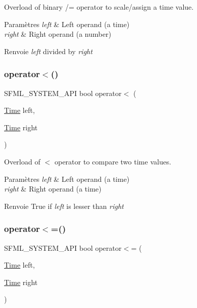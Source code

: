 Overload of binary /= operator to scale/assign a time value. 


\begin{DoxyParams}{Paramètres}
{\em left} & Left operand (a time) \\
\hline
{\em right} & Right operand (a number)\\
\hline
\end{DoxyParams}
\begin{DoxyReturn}{Renvoie}
{\itshape left} divided by {\itshape right} 
\end{DoxyReturn}
\mbox{\label{classsf_1_1Time_ac222933174ddcff5d14c3ac7d1020d54}} 
\subsubsection{\texorpdfstring{operator$<$()}{operator<()}}
{\footnotesize\ttfamily S\+F\+M\+L\+\_\+\+S\+Y\+S\+T\+E\+M\+\_\+\+A\+PI bool operator$<$ (\begin{DoxyParamCaption}\item[{\hyperlink{classsf_1_1Time}{Time}}]{left,  }\item[{\hyperlink{classsf_1_1Time}{Time}}]{right }\end{DoxyParamCaption})\hspace{0.3cm}{\ttfamily [related]}}



Overload of $<$ operator to compare two time values. 


\begin{DoxyParams}{Paramètres}
{\em left} & Left operand (a time) \\
\hline
{\em right} & Right operand (a time)\\
\hline
\end{DoxyParams}
\begin{DoxyReturn}{Renvoie}
True if {\itshape left} is lesser than {\itshape right} 
\end{DoxyReturn}
\mbox{\label{classsf_1_1Time_a2c22369869bf903578635bc6517c44d4}} 
\subsubsection{\texorpdfstring{operator$<$=()}{operator<=()}}
{\footnotesize\ttfamily S\+F\+M\+L\+\_\+\+S\+Y\+S\+T\+E\+M\+\_\+\+A\+PI bool operator$<$= (\begin{DoxyParamCaption}\item[{\hyperlink{classsf_1_1Time}{Time}}]{left,  }\item[{\hyperlink{classsf_1_1Time}{Time}}]{right }\end{DoxyParamCaption})\hspace{0.3cm}{\ttfamily [related]}}



